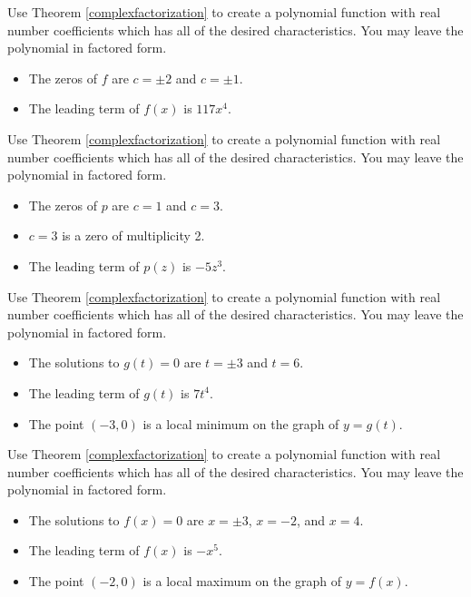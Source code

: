 \documentclass{ximera}
\begin{document}
\begin{problem}\label{buildcomppolyfirst}
Use Theorem \ref{complexfactorization} to create a polynomial function with real number coefficients which has all of the desired characteristics.  You may leave the polynomial in factored form.

\begin{itemize}

\item The zeros of $f$ are $c = \pm 2$ and $c = \pm 1$.
\item The leading term of $f(x)$ is $117x^4$.

\end{itemize}
\end{problem}

\begin{problem}
Use Theorem \ref{complexfactorization} to create a polynomial function with real number coefficients which has all of the desired characteristics.  You may leave the polynomial in factored form.

\begin{itemize}

\item The zeros of $p$ are $c=1$ and $c = 3$.
\item $c=3$ is a zero of multiplicity 2.
\item The leading term of $p(z)$ is $-5z^3$.

\end{itemize}
\end{problem}

\begin{problem}
Use Theorem \ref{complexfactorization} to create a polynomial function with real number coefficients which has all of the desired characteristics.  You may leave the polynomial in factored form.

\begin{itemize}

\item The solutions to $g(t) = 0$ are $t = \pm 3$ and $t=6$.
\item The leading term of $g(t)$ is $7t^4$.
\item The point $(-3,0)$ is a local minimum on the graph of $y=g(t)$.

\end{itemize}
\end{problem}

\begin{problem}
Use Theorem \ref{complexfactorization} to create a polynomial function with real number coefficients which has all of the desired characteristics.  You may leave the polynomial in factored form.

\begin{itemize}

\item The solutions to $f(x) =0$ are $x = \pm 3$, $x=-2$, and $x=4$.
\item The leading term of $f(x)$ is $-x^5$.
\item The point $(-2, 0)$ is a local maximum on the graph of $y=f(x)$.

\end{itemize}
\end{problem}
\end{document}
